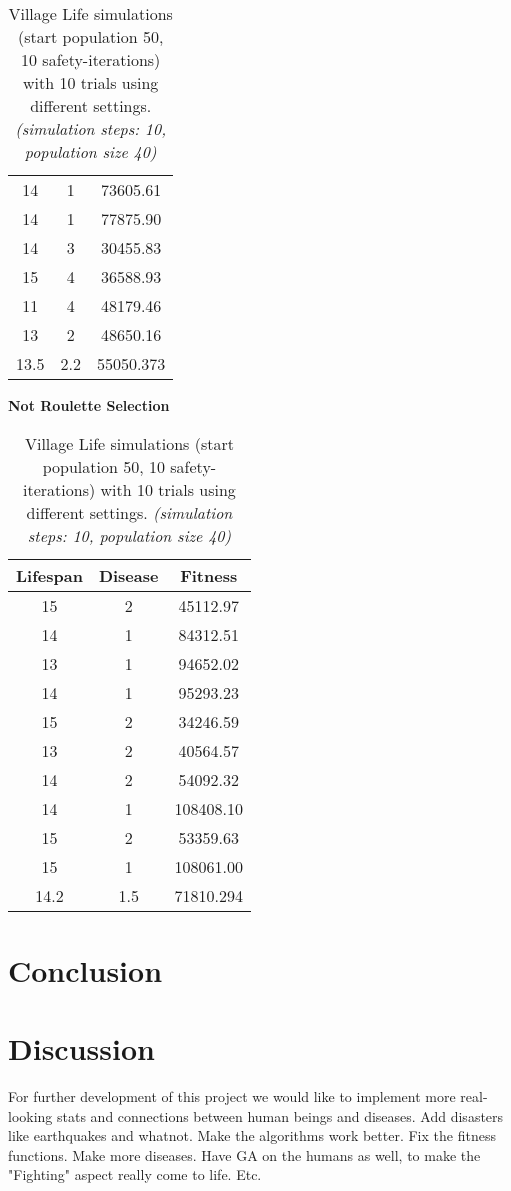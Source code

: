 \documentclass[conference,compsoc]{IEEEtran}
\begin{document}
\begin{table}[!t]
\begin{center}
\begin{minipage}{0.25\textwidth}
\begin{tabular}{|c|c|c|}
	14 & 1 & 73605.61\\
	14 & 1 & 77875.90\\
	14 & 3 & 30455.83\\
	15 & 4 & 36588.93\\
	11 & 4 & 48179.46\\
	13 & 2 & 48650.16\\
	\hline
	13.5 & 2.2 & 55050.373\\
	\hline
	\end{tabular}
\end{minipage}%
\begin{minipage}{0.25\textwidth}
\centering
\textbf{Not Roulette Selection}\\
	\begin{tabular}{|c|c|c|}
	\hline
	Lifespan & Disease & Fitness\\
	\hline
	15 & 2 &  45112.97\\
	14 & 1 &  84312.51\\
	13 & 1 &  94652.02\\
	14 & 1 &  95293.23\\
	15 & 2 &  34246.59\\
	13 & 2 &  40564.57\\
	14 & 2 &  54092.32\\
	14 & 1 & 108408.10\\
	15 & 2 &  53359.63\\
	15 & 1 & 108061.00\\
	\hline
	14.2 & 1.5 & 71810.294\\
	\hline
	\end{tabular}
\end{minipage}%
\end{center}
\caption{Village Life simulations (start population 50, 10 safety-iterations) with 10 trials using different settings. \textit{(simulation steps: 10, population size 40)}}
\label{fig:SettingsExperiment}
\end{table}

\section{Conclusion} 

\section{Discussion}
For further development of this project we would like to implement more real-looking stats and connections between human beings and diseases. Add disasters like earthquakes and whatnot. Make the algorithms work better. Fix the fitness functions. Make more diseases. Have GA on the humans as well, to make the "Fighting" aspect really come to life. Etc.\\
\end{document}
